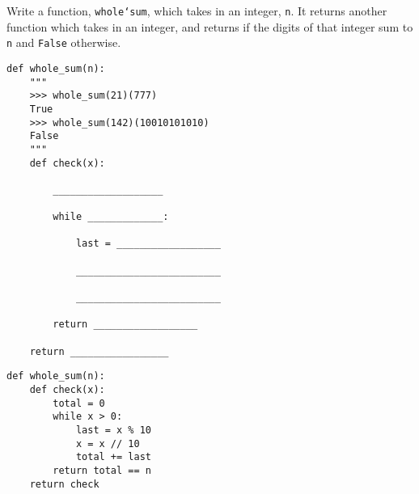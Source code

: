 \begin{blocksection}
\question Write a function, \texttt{whole\char`sum}, which takes in an integer, \texttt{n}. It returns another function which takes in an integer, and returns  if the digits of that integer sum to \texttt{n} and \texttt{False} otherwise.

\begin{lstlisting}
def whole_sum(n): 
    """ 
    >>> whole_sum(21)(777)
    True
    >>> whole_sum(142)(10010101010)
    False
    """
    def check(x):

        ___________________
		
        while _____________:
		
            last = __________________
				
            _________________________
				
            _________________________
				
        return __________________
		
    return _________________

\end{lstlisting}

\begin{solution}
\begin{lstlisting}
def whole_sum(n):
    def check(x):
        total = 0
        while x > 0:
            last = x % 10
            x = x // 10
            total += last
        return total == n
    return check
\end{lstlisting}
\end{solution}
\end{blocksection}
